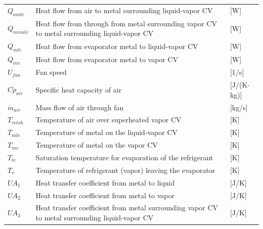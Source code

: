 \begin{center}
	\begin{tabular}{l p{10cm} l}
		$Q_{amlv}$       & Heat flow from air to metal surrounding liquid-vapor CV                                        & [\si{W}]                          \\
		$Q_{mvmlv}$      & Heat flow from through from metal surrounding vapor CV to metal surrounding liquid-vapor CV    & [\si{W}]                          \\
		$Q_{mlv}$        & Heat flow from evaporator metal to liquid-vapor CV                                             & [\si{W}]                          \\
		$Q_{mv}$        & Heat flow from evaporator metal to vapor CV                                                    & [\si{W}]                          \\
		$U_{fan}$       & Fan speed                                                                                      & [1/\si{s}]                        \\
		$Cp_{air}$      & Specific heat capacity of air                                                                  & [\si{J}/(\si{K}$ \cdot $\si{kg})] \\
		$\dot{m}_{air}$ & Mass flow of air through fan                                                                   & [\si{kg}/\si{s}]                  \\
		$T_{retsh}$     & Temperature of air over superheated vapor CV                                                   & [\si{K}]                          \\
		$T_{mlv}$        & Temperature of metal on the liquid-vapor CV                                                    & [\si{K}]                          \\
		$T_{mv}$        & Temperature of metal on the vapor CV                                                           & [\si{K}]                          \\
		$T_{lv}$         & Saturation temperature for evaporation of the refrigerant                                      & [\si{K}]                          \\
		$T_{v}$         & Temperature of refrigerant (vapor) leaving the evaporator                                      & [\si{K}]                          \\
		$UA_1$          & Heat transfer coefficient from metal to liquid                                                 & [\si{J}/\si{K}]                   \\
		$UA_2$          & Heat transfer coefficient from metal to vapor                                                  & [\si{J}/\si{K}]                   \\
		$UA_3$          & Heat transfer coefficient from metal surrounding vapor CV to metal surrounding liquid-vapor CV & [\si{J}/\si{K}]
	\end{tabular}
\end{center}

